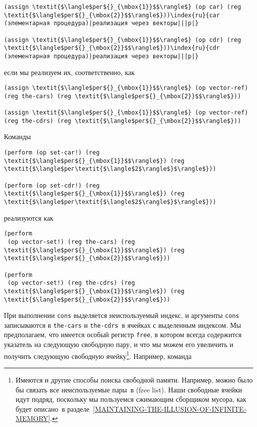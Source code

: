 \begin{Verbatim}[fontsize=\small]
(assign \textit{$\langle$рег${}_{\mbox{1}}$$\rangle$} (op car) (reg \textit{$\langle$рег${}_{\mbox{2}}$$\rangle$}))\index{ru}{car (элементарная процедура)|реализация через векторы|||p|}

(assign \textit{$\langle$рег${}_{\mbox{1}}$$\rangle$} (op cdr) (reg \textit{$\langle$рег${}_{\mbox{2}}$$\rangle$}))\index{ru}{cdr (элементарная процедура)|реализация через векторы|||p|}
\end{Verbatim}
если мы реализуем их, соответственно, как

\begin{Verbatim}[fontsize=\small]
(assign \textit{$\langle$рег${}_{\mbox{1}}$$\rangle$} (op vector-ref) (reg the-cars) (reg \textit{$\langle$рег${}_{\mbox{2}}$$\rangle$}))

(assign \textit{$\langle$рег${}_{\mbox{1}}$$\rangle$} (op vector-ref) (reg the-cdrs) (reg \textit{$\langle$рег${}_{\mbox{2}}$$\rangle$}))
\end{Verbatim}
Команды

\begin{Verbatim}[fontsize=\small]
(perform (op set-car!) (reg \textit{$\langle$рег${}_{\mbox{1}}$$\rangle$}) (reg \textit{$\langle$рег\textit{$\langle$2$\rangle$}$\rangle$}))

(perform (op set-cdr!) (reg \textit{$\langle$рег${}_{\mbox{1}}$$\rangle$}) (reg \textit{$\langle$рег\textit{$\langle$2$\rangle$}$\rangle$}))
\end{Verbatim}
реализуются как

\begin{Verbatim}[fontsize=\small]
(perform 
 (op vector-set!) (reg the-cars) (reg \textit{$\langle$рег${}_{\mbox{1}}$$\rangle$}) (reg \textit{$\langle$рег${}_{\mbox{2}}$$\rangle$}))

(perform 
 (op vector-set!) (reg the-cdrs) (reg \textit{$\langle$рег${}_{\mbox{1}}$$\rangle$}) (reg \textit{$\langle$рег${}_{\mbox{2}}$$\rangle$}))
\end{Verbatim}
При выполнении {\tt cons} выделяется
неиспользуемый индекс, и аргументы {\tt cons} записываются в
{\tt the-cars} и {\tt the-cdrs}~в ячейках с выделенным
индексом.  Мы предполагаем, что имеется особый регистр
{\tt free},
в котором всегда содержится указатель на следующую
свободную пару, и что мы можем его увеличить и получить следующую
свободную ячейку\footnote{Имеются и другие способы поиска свободной памяти.
Например, можно было бы связать все неиспользуемые пары~в 
 (free list). Наши свободные ячейки идут подряд, поскольку мы
пользуемся сжимающим сборщиком мусора, как будет описано~в 
разделе~\ref{MAINTAINING-THE-ILLUSION-OF-INFINITE-MEMORY}.
}.
Например, команда

